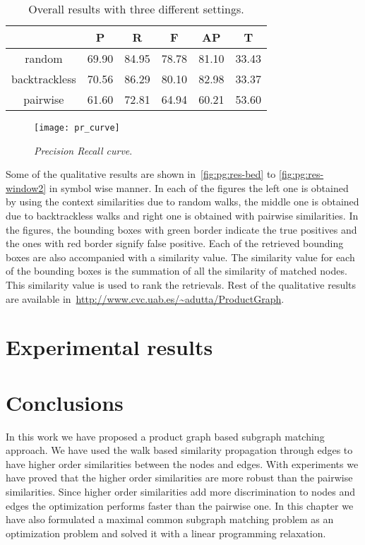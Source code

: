 \begin{table}
\centering
\caption{Overall results with three different settings.}
\begin{tabular}{cccccc}
\toprule
~&\textbf{P}&\textbf{R}&\textbf{F}&\textbf{AP}&\textbf{T}\\
\hline
random & 69.90 & 84.95 & 78.78 & 81.10 & 33.43\\
backtrackless & 70.56 & 86.29 & 80.10 & 82.98 & 33.37\\
pairwise & 61.60 & 72.81 & 64.94 & 60.21 & 53.60\\
\hline
\end{tabular}
\label{table:pg:res-method}
\end{table}

\begin{figure}[!h]
\begin{center}
\texttt{[image: pr\_curve]}
\caption{\emph{Precision Recall curve}.}
\label{fig:pg:pr-curve}
\end{center}
\end{figure}

Some of the qualitative results are shown in~\ref{fig:pg:res-bed} to \ref{fig:pg:res-window2} in symbol wise manner. In each of the figures the left one is obtained by using the context similarities due to random walks, the middle one is obtained due to backtrackless walks and right one is obtained with pairwise similarities. In the figures, the bounding boxes with green border indicate the true positives and the ones with red border signify false positive. Each of the retrieved bounding boxes are also accompanied with a similarity value. The similarity value for each of the bounding boxes is the summation of all the similarity of matched nodes. This similarity value is used to rank the retrievals. Rest of the qualitative results are available in~\url{http://www.cvc.uab.es/~adutta/ProductGraph}.

\section{Experimental results} %
\label{sec:experimental_results}


\section{Conclusions}
\label{sec:pg:concl}
In this work we have proposed a product graph based subgraph matching approach. We have used the walk based similarity propagation through edges to have higher order similarities between the nodes and edges. With experiments we have proved that the higher order similarities are more robust than the pairwise similarities. Since higher order similarities add more discrimination to nodes and edges the optimization performs faster than the pairwise one. In this chapter we have also formulated a maximal common subgraph matching problem as an optimization problem and solved it with a linear programming relaxation.

